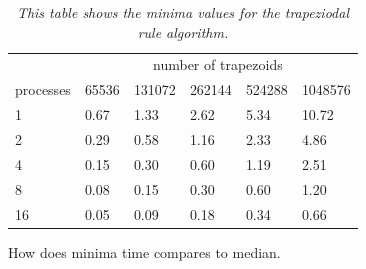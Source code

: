 \documentclass[a4paper,11pt,twoside]{article}
\begin{document}
\begin{table}[]
\centering
\caption{\textit{This table shows the minima values for the trapeziodal rule algorithm.}}
\label{tab:minima_trap}
\begin{tabular}{llllll}
\multicolumn{1}{l|}{}          & \multicolumn{5}{c}{number of trapezoids}                                                                                       \\ \cline{2-6} 
\multicolumn{1}{l|}{processes} & \multicolumn{1}{l|}{65536} & \multicolumn{1}{l|}{131072} & \multicolumn{1}{l|}{262144} & \multicolumn{1}{l|}{524288} & 1048576 \\ \hline
1                              & 0.67                       & 1.33                        & 2.62                        & 5.34                        & 10.72   \\
2                              & 0.29                       & 0.58                        & 1.16                        & 2.33                        & 4.86    \\
4                              & 0.15                       & 0.30                        & 0.60                        & 1.19                        & 2.51    \\
8                              & 0.08                       & 0.15                        & 0.30                        & 0.60                        & 1.20    \\
16                             & 0.05                       & 0.09                        & 0.18                        & 0.34                        & 0.66   
\end{tabular}
\end{table}


How does minima time compares to median.
\end{document}
